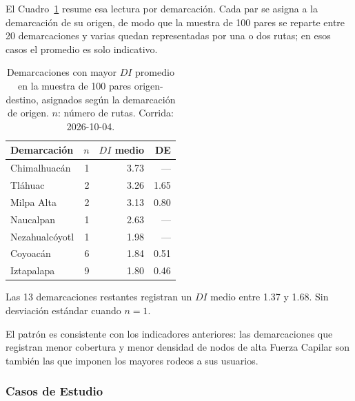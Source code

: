 El Cuadro~\ref{tab:di-alcaldia} resume esa lectura por demarcación. Cada par se
asigna a la demarcación de su origen, de modo que la muestra de 100 pares se
reparte entre 20 demarcaciones y varias quedan representadas por una o dos
rutas; en esos casos el promedio es solo indicativo.

\begin{table}[H]
    \centering
    \caption[Factor de Desviación promedio por demarcación]{%
    Demarcaciones con mayor $DI$ promedio en la muestra de 100 pares
    origen-destino, asignados según la demarcación de origen. $n$: número de
    rutas. Corrida: 2026-10-04.}
    \label{tab:di-alcaldia}
    \small
    \begin{tabular}{|l|r|r|r|}
        \hline
        \textbf{Demarcación} & \textbf{$n$} & \textbf{$DI$ medio} &
        \textbf{DE} \\
        \hline
        Chimalhuacán   & 1 & 3.73 & ---  \\
        Tláhuac        & 2 & 3.26 & 1.65 \\
        Milpa Alta     & 2 & 3.13 & 0.80 \\
        Naucalpan      & 1 & 2.63 & ---  \\
        Nezahualcóyotl & 1 & 1.98 & ---  \\
        Coyoacán       & 6 & 1.84 & 0.51 \\
        Iztapalapa     & 9 & 1.80 & 0.46 \\
        \hline
    \end{tabular}
    \vspace{0.4em}

    \noindent Las 13 demarcaciones restantes registran un $DI$ medio entre
    1.37 y 1.68. Sin desviación estándar cuando $n = 1$.

\end{table}

El patrón es consistente con los indicadores anteriores: las demarcaciones que
registran menor cobertura y menor densidad de nodos de alta Fuerza Capilar son
también las que imponen los mayores rodeos a sus usuarios.

\subsubsection{Casos de Estudio}
\label{subsubsec:di-casos}

